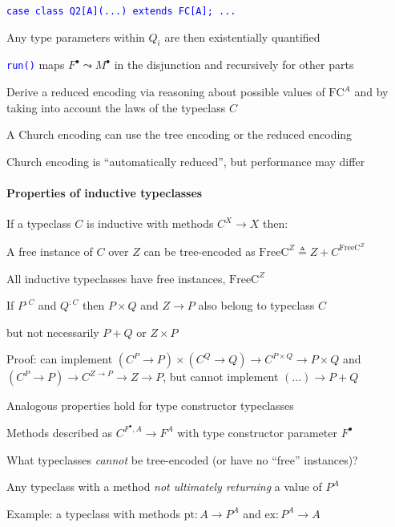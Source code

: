 \texttt{\textcolor{blue}{\footnotesize{}case class Q2{[}A{]}(...)
extends FC{[}A{]}; ...}}{\footnotesize\par}

Any type parameters within $Q_{i}$ are then existentially quantified

\texttt{\textcolor{blue}{\footnotesize{}run()}} maps $F^{\bullet}\leadsto M^{\bullet}$
in the disjunction and recursively for other parts

Derive a reduced encoding via reasoning about possible values of $\text{FC}^{A}$
and by taking into account the laws of the typeclass $C$

A Church encoding can use the tree encoding or the reduced encoding

Church encoding is \textsf{``}automatically reduced\textsf{''}, but performance may
differ


\paragraph{Properties of inductive typeclasses}

If a typeclass $C$ is inductive with methods $C^{X}\rightarrow X$
then:

A free instance of $C$ over $Z$ can be tree-encoded as {\footnotesize{}$\text{FreeC}^{Z}\triangleq Z+C^{\text{FreeC}^{Z}}$} 

All inductive typeclasses have free instances, $\text{FreeC}^{Z}$

If $P^{:C}$ and $Q^{:C}$ then $P\times Q$ and $Z\rightarrow P$
also belong to typeclass $C$

but not necessarily $P+Q$ or $Z\times P$

Proof: can implement $(C^{P}\rightarrow P)\times(C^{Q}\rightarrow Q)\rightarrow C^{P\times Q}\rightarrow P\times Q$
and $\left(C^{P}\rightarrow P\right)\rightarrow C^{Z\rightarrow P}\rightarrow Z\rightarrow P$,
but cannot implement $\left(...\right)\rightarrow P+Q$

Analogous properties hold for type constructor typeclasses

Methods described as $C^{F^{\bullet},A}\rightarrow F^{A}$ with type
constructor parameter $F^{\bullet}$

What typeclasses \emph{cannot} be tree-encoded (or have no \textsf{``}free\textsf{''}
instances)?

Any typeclass with a method \emph{not ultimately returning} a value
of $P^{A}$

Example: a typeclass with methods $\text{pt}:A\rightarrow P^{A}$
and $\text{ex}:P^{A}\rightarrow A$

